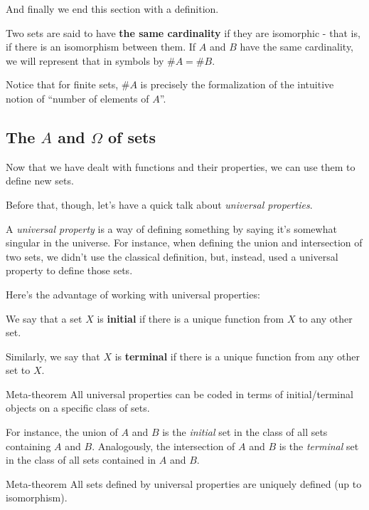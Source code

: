 And finally we end this section with a definition.

\begin{df}
	Two sets are said to have \textbf{the same cardinality} if they are isomorphic - that is, if there is an isomorphism between them. If $A$ and $B$ have the same cardinality, we will represent that in symbols by $\#A=\#B$.
\end{df}

\begin{rmk}
	Notice that for finite sets, $\#A$ is precisely the formalization of the intuitive notion of ``number of elements of $A$''.
\end{rmk}
\newpage
\subsection{The {\(A\)} and {\(\Omega\)} of sets}

Now that we have dealt with functions and their properties, we can use them to define new sets.

Before that, though, let's have a quick talk about \textit{universal properties}.

A \textit{universal property} is a way of defining something by saying it's somewhat singular in the universe. For instance, when defining the union and intersection of two sets, we didn't use the classical definition, but, instead, used a universal property to define those sets.

Here's the advantage of working with universal properties:

\begin{df}
	We say that a set $X$ is \textbf{initial} if there is a unique function from $X$ to any other set.
	
	Similarly, we say that $X$ is \textbf{terminal} if there is a unique function from any other set to $X$.
\end{df}
\begin{blockenv}{Meta-theorem}
	All universal properties can be coded in terms of initial/terminal objects on a specific class of sets.
\end{blockenv}

For instance, the union of $A$ and $B$ is the \textit{initial} set in the class of all sets containing $A$ and $B$. Analogously, the intersection of $A$ and $B$ is the \textit{terminal} set in the class of all sets contained in $A$ and $B$.

\begin{blockenv}{Meta-theorem}
	All sets defined by universal properties are uniquely defined (up to isomorphism).
\end{blockenv}

